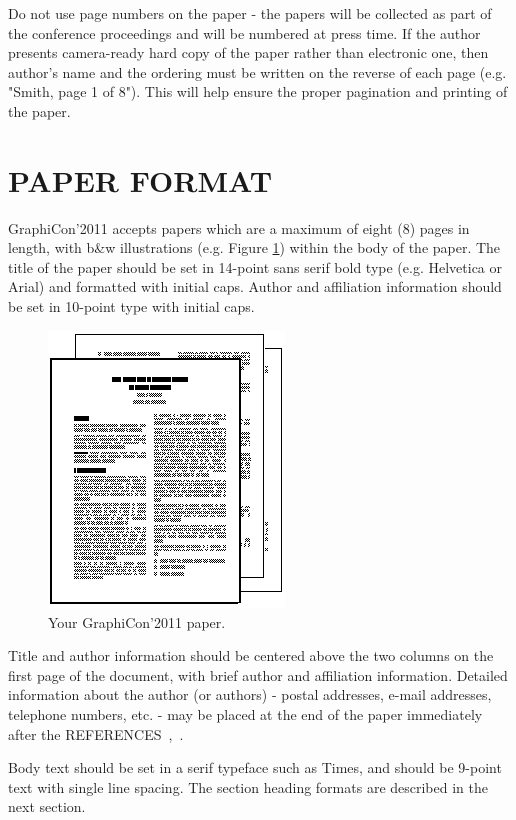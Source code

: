 \documentclass{graphicon}
\begin{document}
Do not use page numbers on the paper - the papers will be collected as part of the conference proceedings and will be numbered at press time. If the author presents camera-ready hard copy of the paper rather than electronic one, then author's name and the ordering must be written on the reverse of each page (e.g. "Smith, page 1 of 8"). This will help ensure the proper pagination and printing of the paper.

\section{PAPER FORMAT}

GraphiCon'2011 accepts papers which are a maximum of eight (8) pages in length, with b\&w illustrations (e.g. Figure \ref{Paper}) within the body of the paper.
The title of the paper should be set in 14-point sans serif bold type (e.g. Helvetica or Arial) and formatted with initial caps.
Author and affiliation information should be set in 10-point type with initial caps.

\begin{figure}[!h]
  \begin{center}
     \includegraphics[width=6.28cm,height=7.34cm]{test_img.png}
  \end{center}
  \caption{Your GraphiCon'2011 paper.}\label{Paper}
\end{figure}


Title and author information should be centered above the two columns on the first page of the document, with brief author and affiliation information. Detailed information about the author (or authors) - postal addresses, e-mail addresses, telephone numbers, etc. - may be placed at the end of the paper immediately after the REFERENCES~\cite{ExampleRef},~\cite{ExampleRef2}.

Body text should be set in a serif typeface such as Times, and should be 9-point text with single line spacing.
The section heading formats are described in the next section.
\end{document}
